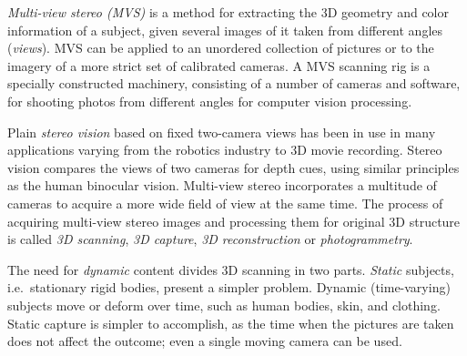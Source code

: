 

\emph{Multi-view stereo (MVS)} is a method for extracting the 3D geometry and color information of a subject, given several images of it taken from different angles (\emph{views}).
MVS can be applied to an unordered collection of pictures or to the imagery of a more strict set of calibrated cameras.
A MVS scanning rig is a specially constructed machinery, consisting of a number of cameras and software, for shooting photos from different angles for computer vision processing.


Plain \emph{stereo vision} based on fixed two-camera views has been in use in many applications varying from the robotics industry to 3D movie recording.
Stereo vision compares the views of two cameras for depth cues, using similar principles as the human binocular vision.
Multi-view stereo incorporates a multitude of cameras to acquire a more wide field of view at the same time.
The process of acquiring multi-view stereo images and processing them for original 3D structure is called \emph{3D scanning}, \emph{3D capture}, \emph{3D reconstruction} or \emph{photogrammetry}.


The need for \emph{dynamic} content divides 3D scanning in two parts.
\emph{Static} subjects, i.e.\ stationary rigid bodies, present a simpler problem.
Dynamic (time-varying) subjects move or deform over time, such as human bodies, skin, and clothing.
Static capture is simpler to accomplish, as the time when the pictures are taken does not affect the outcome; even a single moving camera can be used.



